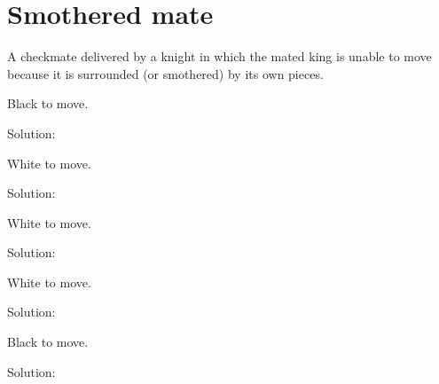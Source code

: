 \documentclass{book}
\begin{document}
\section{Smothered mate}
A checkmate delivered by a knight in which the mated king is unable to move because it is surrounded (or smothered) by its own pieces.\begin{multicols}{2} 
\begin{samepage} 
\newgame 


 
\showboard
 
 Black to move. 
 
Solution: 
 
\end{samepage}\begin{samepage} 
\newgame 


 
\showboard
 
 White to move. 
 
Solution: 
 
\end{samepage}\begin{samepage} 
\newgame 


 
\showboard
 
 White to move. 
 
Solution: 
 
\end{samepage}\begin{samepage} 
\newgame 


 
\showboard
 
 White to move. 
 
Solution: 
 
\end{samepage}\begin{samepage} 
\newgame 


 
\showboard
 
 Black to move. 
 
Solution: 
 

\end{samepage}
\end{multicols}
\end{document}
